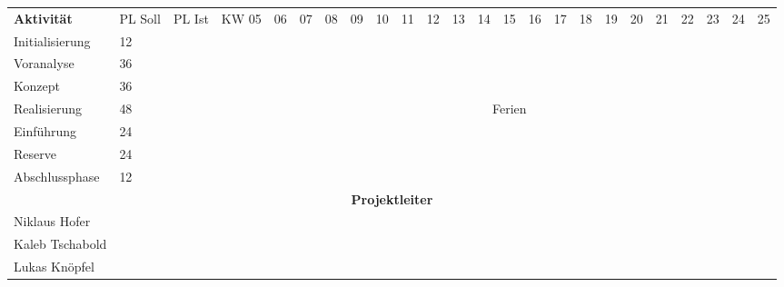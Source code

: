 \documentclass[10pt,paper=a4,final]{scrartcl}
\begin{document}
\begin{landscape}
\begin{tabularx}{\textwidth}{ |p{4.0cm}|l|l|l|l|l|l|l|l|l|l|l|l|l|l|l|l|l|l|l|l|l|l|l| }
\cline{1-24}	%
\bf Aktivit\"at & PL Soll & PL Ist & KW 05 & 06 & 07 & 08 & 09 & 10 & 11 & 12 & 13 & 14 & 15 & 16 & 17 & 18 & 19 & 20 & 21 & 22 & 23 & 24 & 25 \\
\cline{1-24}
Initialisierung & 12 & & & \cellcolor[gray]{0.7} & & & & & & & & & & & & & & & & & & & \\
\cline{1-24}
Voranalyse & 36 & & & & \cellcolor[gray]{0.7} & \cellcolor[gray]{0.7} & \cellcolor[gray]{0.7} & & & & & & & & & & & & & & & & \\
\cline{1-24}
Konzept & 36 & & & & & & & \cellcolor[gray]{0.7} & \cellcolor[gray]{0.7} & \cellcolor[gray]{0.7} & & & & & & & & & & & & & \\
\cline{1-24}
Realisierung & 48 & & & & & & & & & & \cellcolor[gray]{0.7} & \multicolumn{3}{|c|}{Ferien \cellcolor{green!70!}} & \cellcolor[gray]{0.7} & \cellcolor[gray]{0.7} & \cellcolor[gray]{0.7} & & & & & & \\
\cline{1-24}
Einf\"uhrung & 24 & & & & & & & & & & & & & & & & & \cellcolor[gray]{0.7} & \cellcolor[gray]{0.7} & & & & \\
\cline{1-24}
Reserve & 24 & & & & & & & & & & & & & & & & & & & \cellcolor[gray]{0.7} & \cellcolor[gray]{0.7} & & \\
\cline{1-24}
Abschlussphase & 12 & & & & & & & & & & & & & & & & & & & & & \cellcolor[gray]{0.7} & \\
\cline{1-24}
\multicolumn{24}{|c|}{\bf Projektleiter} \\
\cline{1-24}
Niklaus Hofer & & & \cellcolor[gray]{0.7} & \cellcolor[gray]{0.7} & \cellcolor[gray]{0.7} & \cellcolor[gray]{0.7} & \cellcolor[gray]{0.7} & & & & & & & & & & & & & & & & \\
\cline{1-24}
Kaleb Tschabold & & & & & & & & \cellcolor[gray]{0.7} & \cellcolor[gray]{0.7} & \cellcolor[gray]{0.7} & \cellcolor[gray]{0.7} & \cellcolor[gray]{0.7} & \cellcolor[gray]{0.7} & \cellcolor[gray]{0.7} & \cellcolor[gray]{0.7} & & & & & & & & \\
\cline{1-24}
Lukas Kn\"opfel & & & & & & & & & & & & & & & & \cellcolor[gray]{0.7} & \cellcolor[gray]{0.7} & \cellcolor[gray]{0.7} & \cellcolor[gray]{0.7} & \cellcolor[gray]{0.7} & \cellcolor[gray]{0.7} & \cellcolor[gray]{0.7} & \\
\cline{1-24}
\end{tabularx}
\end{landscape}
\end{document}
